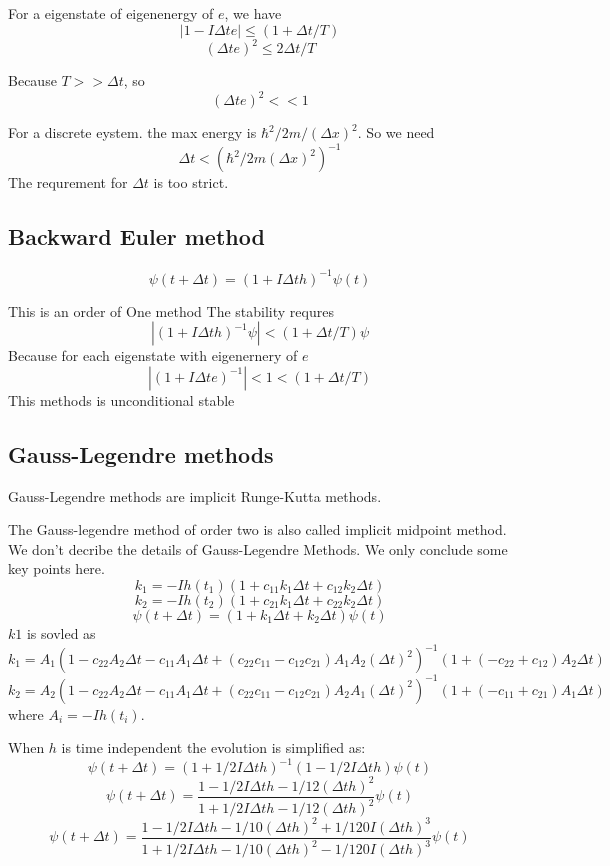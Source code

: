 \documentclass[12pt,twoside]{article}
\begin{document}
 For a eigenstate of eigenenergy of $e$, we have
$$
| 1 - I \Delta t e| \le (1 + \Delta t / T)
$$
$$
(\Delta t e)^2 \le 2 \Delta t / T
$$

Because $T >> \Delta t$, so
$$
(\Delta t e)^2 << 1
$$

For a discrete eystem. the max energy is $\hbar^2/2m/(\Delta x)^2$. So we need
$$
\Delta t < (\hbar^2/2m(\Delta x)^2)^{-1}
$$
The requrement for $\Delta t$ is too strict.

\subsection{Backward Euler method}

$$
\psi(t + \Delta t) = (1 + I \Delta t h)^{-1} \psi(t)
$$

This is an order of One method
The stability requres
$$
|(1 + I \Delta t h)^{-1}\psi| < (1 + \Delta t / T) \psi
$$
Because for each eigenstate with eigenernery of $e$
$$
|(1 + I \Delta t e)^{-1}| < 1 < (1 + \Delta t / T)
$$
This methods is unconditional stable

\subsection{Gauss-Legendre methods}

Gauss-Legendre methods are implicit Runge-Kutta methods.

 The Gauss-legendre method of order two is also called implicit midpoint method.
We don't decribe the details of Gauss-Legendre Methods. We only conclude some key points here.
$$
k_1 = - I h(t_1) (1 + c_{11} k_1\Delta t + c_{12} k_2\Delta t)
$$
$$
k_2 = - I h(t_2) (1 + c_{21} k_1\Delta t + c_{22} k_2\Delta t)
$$
$$
\psi(t+\Delta t) = (1+k_1\Delta t + k_2\Delta t) \psi(t)
$$
$k1$ is sovled as
$$
k_1 = A_1(1-c_{22} A_2\Delta t-c_{11}A_1\Delta t+(c_{22}c_{11}-c_{12}c_{21}) A_1A_2(\Delta t)^2)^{-1}(1+(-c_{22}+c_{12})A_2\Delta t)
$$
$$
k_2 = A_2(1-c_{22}A_2\Delta t -c_{11}A_1\Delta t+(c_{22}c_{11}-c_{12}c_{21}) A_2A_1(\Delta t)^2)^{-1}(1+(-c_{11}+c_{21})A_1\Delta t)
$$
where $A_i=-Ih(t_i)$.


When $h$ is time independent the evolution is simplified as:
$$
\psi(t + \Delta t) = (1 + 1/2 I \Delta t h)^{-1} (1 - 1/2 I \Delta t h) \psi(t)
$$
$$
\psi(t + \Delta t) = \frac{1 - 1/2 I \Delta t h - 1/12 (\Delta t h)^2}{ 1 + 1/2 I \Delta t h - 1/12 (\Delta t h)^2} \psi(t)
$$
$$
\psi(t + \Delta t) = \frac{1 - 1/2 I \Delta t h - 1/10 (\Delta t h)^2 + 1/120 I (\Delta t h)^3}{ 1 + 1/2 I \Delta t h - 1/10 (\Delta t h)^2 - 1/120 I (\Delta t h)^3} \psi(t)
$$
\end{document}
